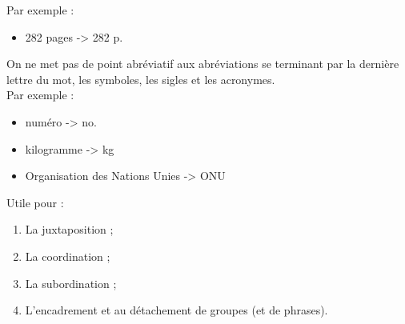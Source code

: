 \documentclass[10pt, french]{article}
\begin{document}
\begin{multicols*}{2}
\begin{definitionNOHFILLprop}
Par exemple :
\begin{itemize}
	\item	282 pages -> 282 p.
\end{itemize}

\begin{astuces}
On ne met pas de point abréviatif aux abréviations se terminant par la dernière lettre du mot, les symboles, les sigles et les acronymes.	\\

Par exemple : 
\begin{itemize}
	\item	numéro -> no.
	\item	kilogramme -> kg
	\item	Organisation des Nations Unies -> ONU
\end{itemize}
\end{astuces}
\end{definitionNOHFILLprop}

\begin{definitionNOHFILL}[La virgule]
Utile pour : 
\begin{enumerate}
	\item	La juxtaposition ;
	\item	La coordination ;
	\item	La subordination ; 
	\item	L'encadrement et au détachement de groupes (et de phrases).
\end{enumerate}


\end{definitionNOHFILL}
\end{multicols*}
\end{document}
